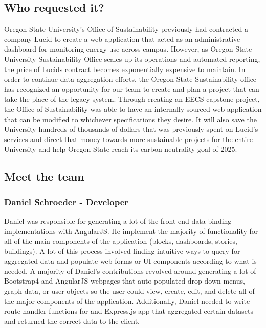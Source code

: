 \documentclass[journal,10pt,onecolumn,compsoc]{IEEEtran}
\begin{document}
    \subsection{Who requested it?}
    \indent Oregon State University's Office of Sustainability previously had contracted a company Lucid to create a web application that acted as an administrative dashboard for monitoring energy use across campus. However, as Oregon State University Sustainability Office scales up its operations and automated reporting, the price of Lucids contract becomes exponentially expensive to maintain. In order to continue data aggregation efforts, the Oregon State Sustainability office has recognized an opportunity for our team to create and plan a project that can take the place of the legacy system. Through creating an EECS capstone project, the Office of Sustainability was able to have an internally sourced web application that can be modified to whichever specifications they desire. It will also save the University hundreds of thousands of dollars that was previously spent on Lucid's services and direct that money towards more sustainable projects for the entire University and help Oregon State reach its carbon neutrality goal of 2025.
    \subsection{Meet the team}
    \subsubsection{Daniel Schroeder - Developer}
    Daniel was responsible for generating a lot of the front-end data binding implementations with AngularJS. He implement the majority of functionality for all of the main components of the application (blocks, dashboards, stories, buildings). A lot of this process involved finding intuitive ways to query for aggregated data and populate web forms or UI components according to what is needed. A majority of Daniel's contributions revolved around generating a lot of Bootstrap4 and AngularJS webpages that auto-populated drop-down menus, graph data, or user objects so the user could view, create, edit, and delete all of the major components of the application. Additionally, Daniel needed to write route handler functions for and Express.js app that aggregated certain datasets and returned the correct data to the client. 
\end{document}
